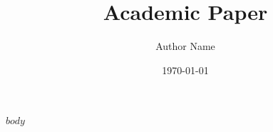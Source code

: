 \documentclass{article}
\begin{document}
    \title{Academic Paper}
    \author{Author Name}
    \date{\today}
    \maketitle
    $body$
\end{document}
